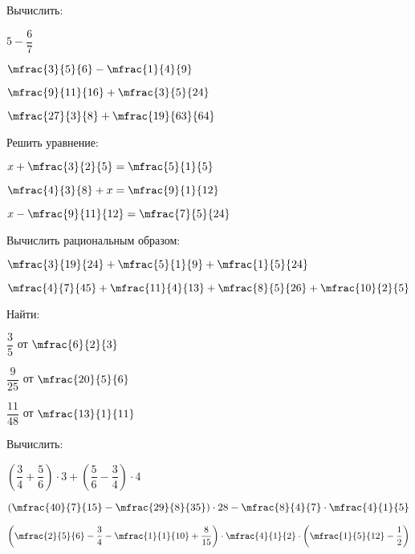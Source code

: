 \begin{class}[number=3]
	\begin{listofex}
		\item Вычислить:
		\begin{enumcols}[itemcolumns=4]
			\item \( 5-\dfrac{6}{7} \)
			\item \( \mfrac{3}{5}{6}-\mfrac{1}{4}{9} \)
			\item \( \mfrac{9}{11}{16}+\mfrac{3}{5}{24} \)
			\item \( \mfrac{27}{3}{8}+\mfrac{19}{63}{64} \)
		\end{enumcols}
		\item Решить уравнение:
		\begin{enumcols}[itemcolumns=3]
			\item \( x+\mfrac{3}{2}{5}=\mfrac{5}{1}{5} \)
			\item \( \mfrac{4}{3}{8}+x=\mfrac{9}{1}{12} \)
			\item \( x-\mfrac{9}{11}{12}=\mfrac{7}{5}{24} \)
		\end{enumcols}
		\item Вычислить рациональным образом:
		\begin{enumcols}[itemcolumns=2]
			\item \( \mfrac{3}{19}{24}+\mfrac{5}{1}{9}+\mfrac{1}{5}{24} \)
			\item \( \mfrac{4}{7}{45}+\mfrac{11}{4}{13}+\mfrac{8}{5}{26}+\mfrac{10}{2}{5} \)
		\end{enumcols}
		\item Найти:
		\begin{enumcols}[itemcolumns=3]
			\item \( \dfrac{3}{5} \) от \( \mfrac{6}{2}{3} \)
			\item \( \dfrac{9}{25} \) от \( \mfrac{20}{5}{6} \)
			\item \( \dfrac{11}{48} \) от \( \mfrac{13}{1}{11} \)
		\end{enumcols}
		\item Вычислить: %
		\begin{enumcols}[itemcolumns=2]
			\item \( \left( \dfrac{3}{4}+\dfrac{5}{6} \right)\cdot3+\left( \dfrac{5}{6}-\dfrac{3}{4} \right)\cdot4 \)
			\item \( \left( \mfrac{40}{7}{15}-\mfrac{29}{8}{35} \right)\cdot28-\mfrac{8}{4}{7}\cdot\mfrac{4}{1}{5} \)
			\item \( \left( \mfrac{2}{5}{6}-\dfrac{3}{4}-\mfrac{1}{1}{10}+\dfrac{8}{15} \right)\cdot\mfrac{4}{1}{2}\cdot\left( \mfrac{1}{5}{12}-\dfrac{1}{2} \right) \)

\end{enumcols}
\end{listofex}
\end{class}
